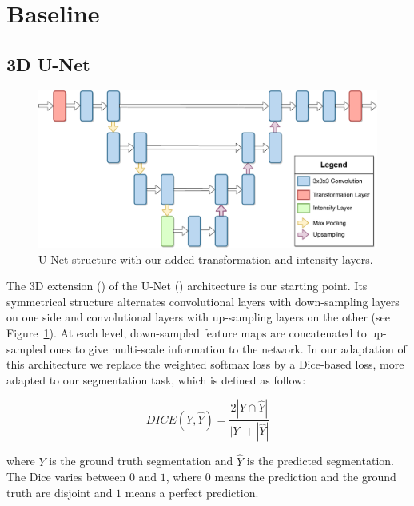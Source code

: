 \section{Baseline}
\label{sec:kidney_baseline}

\subsection{3D U-Net}
\label{ssec:unet}

\begin{figure}[htbp]
    \centering
	\includegraphics[width=\textwidth]{img_transfer/UNet}
    \caption{U-Net structure with our added transformation and intensity layers.}
    \label{fig:unet}
\end{figure}

The 3D extension (\textcite{cicek2016MICCAI}) of the U-Net (\textcite{ronneberger2015MICCAI}) architecture is our starting point. Its symmetrical structure alternates convolutional layers with down-sampling layers on one side and convolutional layers with up-sampling layers on the other (see Figure~\ref{fig:unet}). At each level, down-sampled feature maps are concatenated to up-sampled ones to give multi-scale information to the network. In our adaptation of this architecture we replace the weighted softmax loss by a Dice-based loss, more adapted to our segmentation task, which is defined as follow:

\begin{equation}
    DICE \left( Y, \hat{Y} \right) = \frac{2 |Y \cap \hat{Y}|}{|Y| + |\hat{Y}|}
\end{equation}

where $Y$ is the ground truth segmentation and $\hat{Y}$ is the predicted segmentation. The Dice varies between $0$ and $1$, where $0$ means the prediction and the ground truth are disjoint and $1$ means a perfect prediction.

